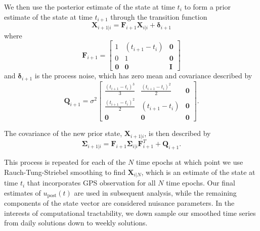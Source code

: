 \documentclass[review]{elsarticle}
\begin{document}
We then use the posterior estimate of the state at time $t_i$ to form a prior estimate of the state at time $t_{i+1}$ through the transition function
\begin{equation}\label{predict}
  \mathbf{X}_{i+1|i} = \mathbf{F}_{i+1}\mathbf{X}_{i|i} + \mathbf{\delta}_{i+1} 
\end{equation}
where 
\begin{equation}
  \mathbf{F}_{i+1} = 
  \left[
  \begin{array}{ccc}
    1           & (t_{i+1} - t_i) & \mathbf{0}\\
    0           & 1              & \mathbf{0}\\
    \mathbf{0}  & \mathbf{0}     & \mathbf{I}
  \end{array}
  \right]
\end{equation}
and $\mathbf{\delta}_{i+1}$ is the process noise, which has zero mean and covariance described by
\begin{equation}
  \mathbf{Q}_{i+1} = 
  \sigma^2 \left[
  \begin{array}{ccc}
  \frac{(t_{i+1} - t_i)^3}{3} & \frac{(t_{i+1} - t_{i})^2}{2} & \mathbf{0}\\
  \frac{(t_{i+1} - t_i)^2}{2} & (t_{i+1} - t_{i}) & \mathbf{0}\\ 
  \mathbf{0} & \mathbf{0} & \mathbf{0}
  \end{array}
  \right].
\end{equation}

The covariance of the new prior state, $\mathbf{X}_{i+1|i}$, is then described by
\begin{equation}
  \mathbf{\Sigma}_{i+1|i} = \mathbf{F}_{i+1}\mathbf{\Sigma}_{i|i}\mathbf{F}^T_{i+1} + \mathbf{Q}_{i+1}.
\end{equation}

This process is repeated for each of the $N$ time epochs at which point we use Rauch-Tung-Striebel smoothing \citep{Rauch1965} to find $\mathbf{X}_{i|N}$, which is an estimate of the state at time $t_i$ that incorporates GPS observation for all $N$ time epochs.  Our final estimates of $u_\mathrm{post}(t)$ are used in subsequent analysis, while the remaining components of the state vector are considered nuisance parameters. In the interests of computational tractability, we down sample our smoothed time series from daily solutions down to weekly solutions.
\end{document}
